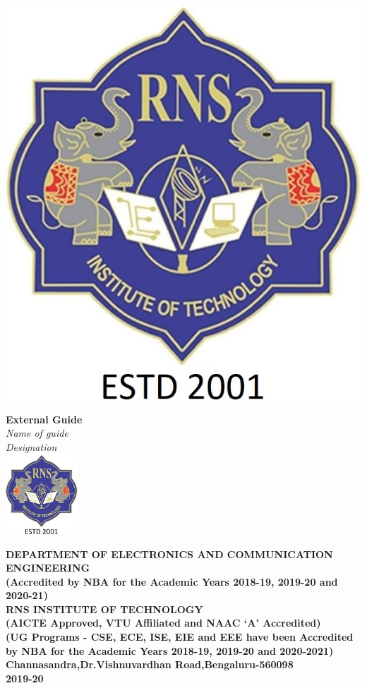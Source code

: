 \begin{titlingpage}
\begin{minipage}[t]{0.3\textwidth}
	\centering\includegraphics[height=3 cm]{images/rns1.jpg}
\end{minipage}\hspace{5cm}
\begin{minipage}[t]{0.3\textwidth}%
	\Large\textbf{External Guide}\\
	\centering\large\textit{\color{blue}Name of guide}\\
	\centering\large\textit{\color{blue}Designation}\\
	
	\centering\includegraphics[height=3cm]{images/rns1.jpg}\\
\end{minipage}



\begin{center}
\vspace{0.5cm}
\scriptsize\textbf{\color{blue}DEPARTMENT OF ELECTRONICS AND COMMUNICATION ENGINEERING\\
\small(Accredited by NBA for the Academic Years 2018-19, 2019-20 and 2020-21)}\\
\vspace{0.5cm}
\small\textbf{\color{blue}RNS INSTITUTE OF TECHNOLOGY\\
(AICTE Approved, VTU Affiliated and NAAC `A' Accredited)\\
(UG Programs - CSE, ECE, ISE, EIE and EEE have been Accredited by NBA for the Academic Years 2018-19, 2019-20 and 2020-2021)\\
Channasandra,Dr.Vishnuvardhan Road,Bengaluru-560098\\
\vspace{0.5cm}
2019-20}
\end{center}
\end{titlingpage}
